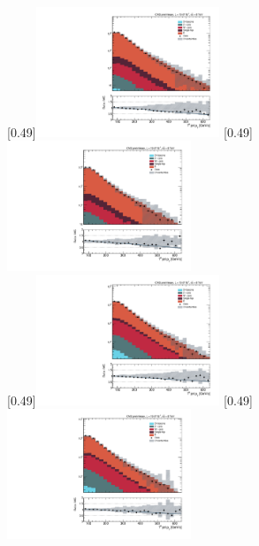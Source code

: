 \begin{figure}[p!] \centering
    [0.49\textwidth]{\includegraphics[width=0.49\textwidth,angle=-90,origin=c]{annexes/figs/higgs/data_mc/2-btag/semimu/firstJetPt_reco_fullsel.pdf}} \hfill
    [0.49\textwidth]{\includegraphics[width=0.49\textwidth,angle=-90,origin=c]{annexes/figs/higgs/data_mc/2-btag/semie/firstJetPt_reco_fullsel.pdf}} \\ \vspace{5mm}
    [0.49\textwidth]{\includegraphics[width=0.49\textwidth,angle=-90,origin=c]{annexes/figs/higgs/data_mc/1-btag/semimu/firstJetPt_reco_fullsel.pdf}} \hfill
    [0.49\textwidth]{\includegraphics[width=0.49\textwidth,angle=-90,origin=c]{annexes/figs/higgs/data_mc/1-btag/semie/firstJetPt_reco_fullsel.pdf}}

\end{figure}
